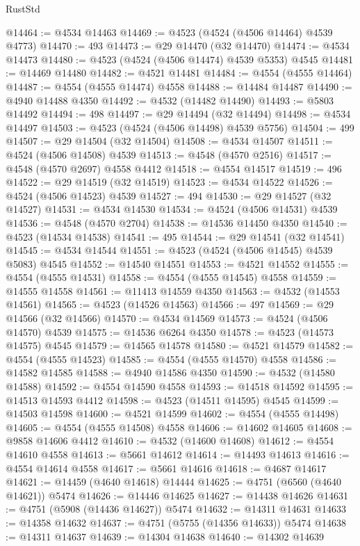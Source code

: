 \begin{lexlean}{RustStd}
\begin{coremodule}
@14464 := @4534 @14463
@14469 := @4523 (@4524 (@4506 @14464) @4539 @4773)
@14470 := 493
@14473 := @29 @14470 (@32 @14470)
@14474 := @4534 @14473
@14480 := @4523 (@4524 (@4506 @14474) @4539 @5353) @4545
@14481 := @14469 @14480
@14482 := @4521 @14481
@14484 := @4554 (@4555 @14464)
@14487 := @4554 (@4555 @14474) @4558
@14488 := @14484 @14487
@14490 := @4940 @14488 @4350
@14492 := @4532 (@14482 @14490)
@14493 := @5803 @14492
@14494 := 498
@14497 := @29 @14494 (@32 @14494)
@14498 := @4534 @14497
@14503 := @4523 (@4524 (@4506 @14498) @4539 @5756)
@14504 := 499
@14507 := @29 @14504 (@32 @14504)
@14508 := @4534 @14507
@14511 := @4524 (@4506 @14508) @4539
@14513 := @4548 (@4570 @2516)
@14517 := @4548 (@4570 @2697) @4558 @4412
@14518 := @4554 @14517
@14519 := 496
@14522 := @29 @14519 (@32 @14519)
@14523 := @4534 @14522
@14526 := @4524 (@4506 @14523) @4539
@14527 := 494
@14530 := @29 @14527 (@32 @14527)
@14531 := @4534 @14530
@14534 := @4524 (@4506 @14531) @4539
@14536 := @4548 (@4570 @2704)
@14538 := @14536 @14450 @4350
@14540 := @4523 (@14534 @14538)
@14541 := 495
@14544 := @29 @14541 (@32 @14541)
@14545 := @4534 @14544
@14551 := @4523 (@4524 (@4506 @14545) @4539 @5083) @4545
@14552 := @14540 @14551
@14553 := @4521 @14552
@14555 := @4554 (@4555 @14531)
@14558 := @4554 (@4555 @14545) @4558
@14559 := @14555 @14558
@14561 := @11413 @14559 @4350
@14563 := @4532 (@14553 @14561)
@14565 := @4523 (@14526 @14563)
@14566 := 497
@14569 := @29 @14566 (@32 @14566)
@14570 := @4534 @14569
@14573 := @4524 (@4506 @14570) @4539
@14575 := @14536 @6264 @4350
@14578 := @4523 (@14573 @14575) @4545
@14579 := @14565 @14578
@14580 := @4521 @14579
@14582 := @4554 (@4555 @14523)
@14585 := @4554 (@4555 @14570) @4558
@14586 := @14582 @14585
@14588 := @4940 @14586 @4350
@14590 := @4532 (@14580 @14588)
@14592 := @4554 @14590 @4558
@14593 := @14518 @14592
@14595 := @14513 @14593 @4412
@14598 := @4523 (@14511 @14595) @4545
@14599 := @14503 @14598
@14600 := @4521 @14599
@14602 := @4554 (@4555 @14498)
@14605 := @4554 (@4555 @14508) @4558
@14606 := @14602 @14605
@14608 := @9858 @14606 @4412
@14610 := @4532 (@14600 @14608)
@14612 := @4554 @14610 @4558
@14613 := @5661 @14612
@14614 := @14493 @14613
@14616 := @4554 @14614 @4558
@14617 := @5661 @14616
@14618 := @4687 @14617
@14621 := @14459 (@4640 @14618) @14444
@14625 := @4751 (@6560 (@4640 @14621)) @5474
@14626 := @14446 @14625
@14627 := @14438 @14626
@14631 := @4751 (@5908 (@14436 @14627)) @5474
@14632 := @14311 @14631
@14633 := @14358 @14632
@14637 := @4751 (@5755 (@14356 @14633)) @5474
@14638 := @14311 @14637
@14639 := @14304 @14638
@14640 := @14302 @14639

\end{coremodule}
\end{lexlean}
